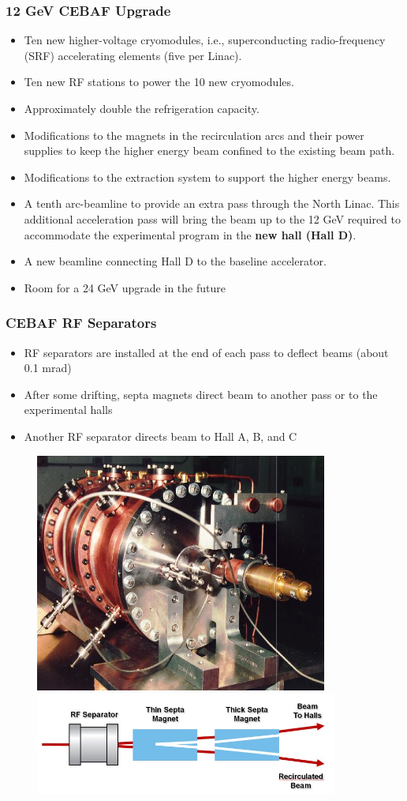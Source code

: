\documentclass{beamer}
\begin{document}

\begin{frame}
\frametitle{12 GeV CEBAF Upgrade}
\begin{itemize}
\item Ten new higher-voltage cryomodules, i.e., superconducting radio-frequency (SRF) accelerating elements (five per Linac).
\item Ten new RF stations to power the 10 new cryomodules.
\item Approximately double the refrigeration capacity.
\item Modifications to the magnets in the recirculation arcs and their power supplies to keep the higher energy beam confined to the existing beam path.
\item Modifications to the extraction system to support the higher energy beams.
\item A tenth arc-beamline to provide an extra pass through the North Linac. This additional acceleration pass will bring the beam up to the 12 GeV required to accommodate the experimental program in the \textbf{new hall (Hall D)}.
\item A new beamline connecting Hall D to the baseline accelerator.
\item Room for a 24 GeV upgrade in the future
\end{itemize}

\end{frame}


\begin{frame}
\frametitle{CEBAF RF Separators}
\begin{itemize}
\item RF separators are installed at the end of each pass to deflect beams (about 0.1 mrad)
\item After some drifting, septa magnets direct beam to another pass or to the experimental halls
\item Another RF separator directs beam to Hall A, B, and C
\end{itemize}
\begin{figure}
\includegraphics[width=0.35\linewidth]{figs/rf_kicker.png}
\includegraphics[width=0.70\linewidth]{figs/rf_separator2.png}
\end{figure}

\end{frame}
\end{document}
